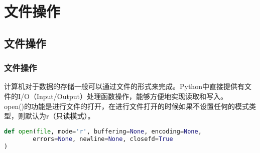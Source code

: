 \chapter{文件操作}

\section{文件操作}

\subsection{文件操作}

计算机对于数据的存储一般可以通过文件的形式来完成。Python中直接提供有文件的I/O（Input/Output）处理函数操作，能够方便地实现读取和写入。\\

open()的功能是进行文件的打开，在进行文件打开的时候如果不设置任何的模式类型，则默认为r（只读模式）。

\vspace{-0.5cm}

\begin{lstlisting}[language=Python]
def open(file, mode='r', buffering=None, encoding=None,
    	errors=None, newline=None, closefd=True
)
\end{lstlisting}

\begin{table}[H]
	\centering
	\caption{文件打开模式}
\end{table}

